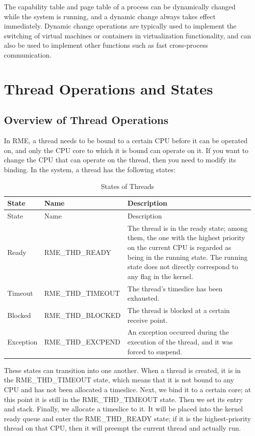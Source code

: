 The capability table and page table of a process can be dynamically changed while the system is running, and a dynamic change always takes effect immediately. Dynamic change operations are typically used to implement the switching of virtual machines or containers in virtualization functionality, and can also be used to implement other functions such as fast cross-process communication.

\section{Thread Operations and States}\label{sec:4-thread-operations-and-states}

\subsection{Overview of Thread Operations}\label{subsec:4-thread-operations-overview}

In RME, a thread needs to be bound to a certain CPU before it can be operated on, and only the CPU core to which it is bound can operate on it. If you want to change the CPU that can operate on the thread, then you need to modify its binding. In the system, a thread has the following states:

\begin{xltabular}{\textwidth}{@{}>{\hsize\raggedright\arraybackslash}X>{\hsize\raggedright\arraybackslash}X>{\hsize\raggedright\arraybackslash}X@{}}
\caption{States of Threads}\label{tab:4-1-thread-states}\\
\toprule
State & Name & Description\tabularnewline
\endfirsthead
\toprule
State & Name & Description\tabularnewline
\midrule
\endhead
\bottomrule
\endlastfoot
Ready & RME\_THD\_READY &
The thread is in the ready state; among them, the one with the highest priority on the current CPU is regarded as being in the running state. The running state does not directly correspond to any flag in the kernel.\tabularnewline
Timeout & RME\_THD\_TIMEOUT & The thread's timeslice has been exhausted.\tabularnewline
Blocked & RME\_THD\_BLOCKED & The thread is blocked at a certain receive point.\tabularnewline
Exception & RME\_THD\_EXCPEND &
An exception occurred during the execution of the thread, and it was forced to suspend.\tabularnewline
\end{xltabular}
\nopagebreak[4]

These states can transition into one another. When a thread is created, it is in the RME\_THD\_TIMEOUT state, which means that it is not bound to any CPU and has not been allocated a timeslice. Next, we bind it to a certain core; at this point it is still in the RME\_THD\_TIMEOUT state. Then we set its entry and stack. Finally, we allocate a timeslice to it. It will be placed into the kernel ready queue and enter the RME\_THD\_READY state; if it is the highest-priority thread on that CPU, then it will preempt the current thread and actually run.

